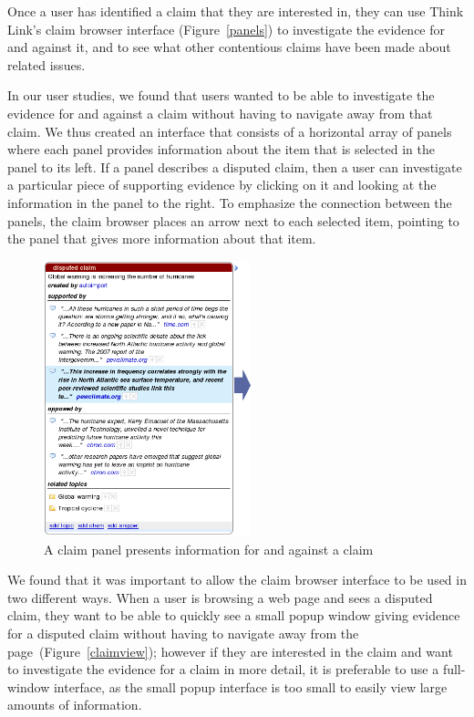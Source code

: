 \documentclass{chi2009}
\begin{document}
Once a user has identified a claim that they are interested in, they can use Think Link's claim browser interface (Figure~\ref{panels}) to investigate the evidence for and against it, and to see what other contentious claims have been made about related issues. 

In our user studies, we found that users wanted to be able to investigate the evidence for and against a claim without having to navigate away from that claim. We thus created an interface that consists of a horizontal array of panels where each panel provides information about the item that is selected in the panel to its left. If a panel describes a disputed claim, then a user can investigate a particular piece of supporting evidence by clicking on it and looking at the information in the panel to the right. 
To emphasize the connection between the panels, the claim browser places an arrow next to each selected item, pointing to the panel that gives more information about that item. %

\begin{figure}[tb]
	\begin{center}
	\includegraphics[width=6cm]{../screenshots/v2_panel.png}
	\caption{A claim panel presents information for and against a claim}
	\label{panel}
	\end{center}
\end{figure}


We found that it was important to allow the claim browser interface to be used in two different ways. 
When a user is browsing a web page and sees a disputed claim, they want to be able to quickly see a small popup window giving evidence for a disputed claim without having to navigate away from the page~(Figure~\ref{claimview}); however if they are interested in the claim and want to investigate the evidence for a claim in more detail, it is preferable to use a full-window interface, as the small popup interface is too small to easily view large amounts of information.  %
\end{document}

